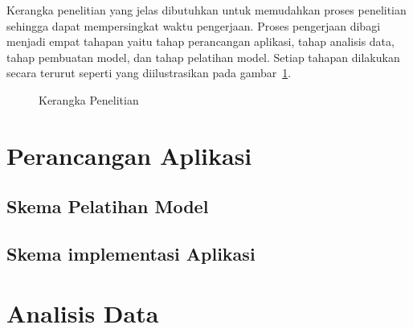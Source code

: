Kerangka penelitian yang jelas dibutuhkan untuk memudahkan proses penelitian sehingga dapat
mempersingkat waktu pengerjaan. Proses pengerjaan dibagi menjadi empat tahapan yaitu tahap
perancangan aplikasi, tahap analisis data, tahap pembuatan model, dan tahap pelatihan model.
Setiap tahapan dilakukan secara terurut seperti yang diilustrasikan pada gambar~\ref{fig:kerangkapenelitian}.

\begin{figure}[htbp]
    \begin{center}
    \end{center}
    \vspace{-20pt}
    \captionsetup{labelfont=bf, textfont=bf}
    \caption{Kerangka Penelitian}
    \vspace{-10pt}
    \captionsetup{labelfont=md, textfont=md}
    \label{fig:kerangkapenelitian}
\end{figure}

\section{Perancangan Aplikasi} \label{sec:3-PerancanganAplikasi}

\subsection{Skema Pelatihan Model}

\subsection{Skema implementasi Aplikasi}

\section{Analisis Data} \label{sec:3-AnalisisData}

